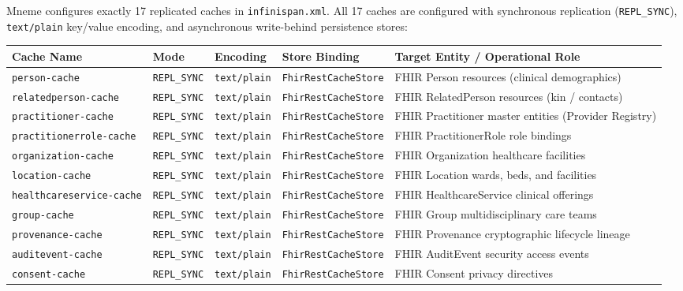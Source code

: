 Mneme configures exactly 17 replicated caches in \texttt{infinispan.xml}. All 17 caches are configured with synchronous replication (\texttt{REPL\_SYNC}), \texttt{text/plain} key/value encoding, and asynchronous write-behind persistence stores:

\begin{table}[htbp]
\centering
\scriptsize
\begin{tabularx}{\textwidth}{l l l l Y}
\toprule
\textbf{Cache Name} & \textbf{Mode} & \textbf{Encoding} & \textbf{Store Binding} & \textbf{Target Entity / Operational Role} \\
\midrule
\texttt{person-cache} & \texttt{REPL\_SYNC} & \texttt{text/plain} & \texttt{FhirRestCacheStore} & FHIR Person resources (clinical demographics) \\
\texttt{relatedperson-cache} & \texttt{REPL\_SYNC} & \texttt{text/plain} & \texttt{FhirRestCacheStore} & FHIR RelatedPerson resources (kin / contacts) \\
\texttt{practitioner-cache} & \texttt{REPL\_SYNC} & \texttt{text/plain} & \texttt{FhirRestCacheStore} & FHIR Practitioner master entities (Provider Registry) \\
\texttt{practitionerrole-cache} & \texttt{REPL\_SYNC} & \texttt{text/plain} & \texttt{FhirRestCacheStore} & FHIR PractitionerRole role bindings \\
\texttt{organization-cache} & \texttt{REPL\_SYNC} & \texttt{text/plain} & \texttt{FhirRestCacheStore} & FHIR Organization healthcare facilities \\
\texttt{location-cache} & \texttt{REPL\_SYNC} & \texttt{text/plain} & \texttt{FhirRestCacheStore} & FHIR Location wards, beds, and facilities \\
\texttt{healthcareservice-cache} & \texttt{REPL\_SYNC} & \texttt{text/plain} & \texttt{FhirRestCacheStore} & FHIR HealthcareService clinical offerings \\
\texttt{group-cache} & \texttt{REPL\_SYNC} & \texttt{text/plain} & \texttt{FhirRestCacheStore} & FHIR Group multidisciplinary care teams \\
\texttt{provenance-cache} & \texttt{REPL\_SYNC} & \texttt{text/plain} & \texttt{FhirRestCacheStore} & FHIR Provenance cryptographic lifecycle lineage \\
\texttt{auditevent-cache} & \texttt{REPL\_SYNC} & \texttt{text/plain} & \texttt{FhirRestCacheStore} & FHIR AuditEvent security access events \\
\texttt{consent-cache} & \texttt{REPL\_SYNC} & \texttt{text/plain} & \texttt{FhirRestCacheStore} & FHIR Consent privacy directives \\

\end{tabularx}
\end{table}
